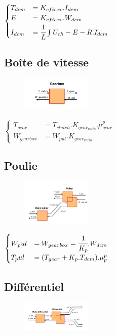 $\begin{cases}
	 T_{dcm} &= K_{cfiexc}.I_{dcm}\\
	E &= K_{cfiexc}.W_{dcm}\\
	I_{dcm} &= \cfrac{1}{L}\int{U_{ch}-E-R.I_{dcm}}	
\end{cases}$


\subsection{Boîte de vitesse}

\begin{figure}
\includegraphics[width=0.3\textwidth]{images/Gearbox.png}
\end{figure}

$\begin{cases}
	 T_{gear} &= T_{clutch}.K_{gear_{ratio}}.\mu{}_{gear}^{p}\\
	W_{gearbox} &= W_{pul}.K_{gear_{ratio}}
\end{cases}$


\subsection{Poulie}

\begin{figure}
\includegraphics[width=0.3\textwidth]{images/Pulley.png}
\end{figure}

$\begin{cases}
	W_pul &= W_{gearbox} = \cfrac{1}{K_p}.W_{dcm} \\
	T_pul &= (T_{gear}+K_p.T_{dcm}).\mu{}_p^{p}
\end{cases}$


\subsection{Différentiel}

\begin{figure}
\includegraphics[width=0.3\textwidth]{images/Differential.png}
\end{figure}

